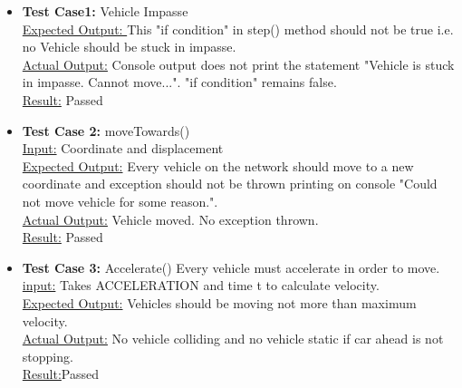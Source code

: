 \documentclass[11pt]{article}
\begin{document}
\begin{enumerate}
\begin{itemize}
\begin{enumerate}
\begin{itemize} %
\item \textbf{Test Case1:} \hspace{6 mm} Vehicle Impasse\hfill \\
\underline{Expected Output: }\hspace{6 mm}This "if condition" in step() method should not be true i.e. no Vehicle should be stuck in impasse.\hfill \\
\underline{Actual Output:} \hspace{6 mm}Console output does not print the statement "Vehicle is stuck in impasse. Cannot move...". "if condition" remains false.\hfill \\
\underline{Result:} Passed\hfill \\



\item \textbf{Test Case 2:} \hspace{6 mm}moveTowards()\hfill \\
\underline{Input:} \hspace{6 mm}Coordinate and displacement\hfill \\
\underline{Expected Output:} \hspace{6 mm}Every vehicle on the network should move to a new coordinate and exception should not be thrown printing on console "Could not move vehicle for some reason.". \hfill \\
\underline{Actual Output:} \hspace{6 mm}Vehicle moved. No exception thrown.\hfill \\
\underline{Result:} \hspace{6 mm}Passed\hfill \\
\item \textbf{Test Case 3:} \hspace{6 mm}Accelerate() Every vehicle must accelerate in order to move.\hfill \\
\underline{input:} \hspace{6 mm}Takes ACCELERATION and time t to calculate velocity.\hfill \\
\underline{Expected Output:} \hspace{6 mm}Vehicles should be moving not more than maximum velocity.\hfill \\
\underline{Actual Output:} \hspace{6 mm}No vehicle colliding and no vehicle static if car ahead is not stopping.\hfill \\
\underline{Result:}Passed\hfill \\


\end{itemize}
\end{enumerate}
\end{itemize}
\end{enumerate}
\end{document}
